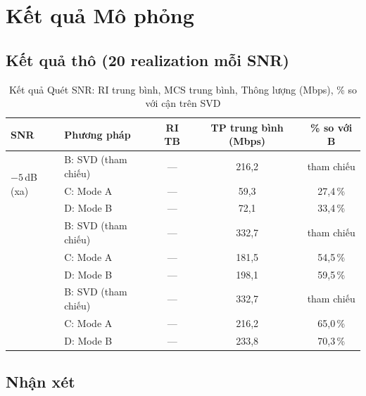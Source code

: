 \documentclass[11pt,a4paper]{article}
\begin{document}
\FloatBarrier
\section{Kết quả Mô phỏng}

\subsection{Kết quả thô (20 realization mỗi SNR)}

\begin{table}[h!]
\centering
\caption{Kết quả Quét SNR: RI trung bình, MCS trung bình, Thông lượng (Mbps), \% so với cận trên SVD}
\label{tab:results}
\begin{tabular}{llccc}
\toprule
\textbf{SNR} & \textbf{Phương pháp} & \textbf{RI TB} & \textbf{TP trung bình (Mbps)} & \textbf{\% so với B} \\
\midrule
\multirow{3}{*}{$-5$\,dB (xa)}
  & B: SVD (tham chiếu) & --- & 216{,}2 & tham chiếu \\
  & C: Mode A           & --- & 59{,}3  & 27{,}4\,\% \\
  & D: Mode B           & --- & 72{,}1  & 33{,}4\,\% \\
\addlinespace
\multirow{3}{*}{$+10$\,dB (trung bình)}
  & B: SVD (tham chiếu) & --- & 332{,}7 & tham chiếu \\
  & C: Mode A           & --- & 181{,}5 & 54{,}5\,\% \\
  & D: Mode B           & --- & 198{,}1 & 59{,}5\,\% \\
\addlinespace
\multirow{3}{*}{$+25$\,dB (gần)}
  & B: SVD (tham chiếu) & --- & 332{,}7 & tham chiếu \\
  & C: Mode A           & --- & 216{,}2 & 65{,}0\,\% \\
  & D: Mode B           & --- & 233{,}8 & 70{,}3\,\% \\
\bottomrule
\end{tabular}
\end{table}

\subsection{Nhận xét}
\end{document}
